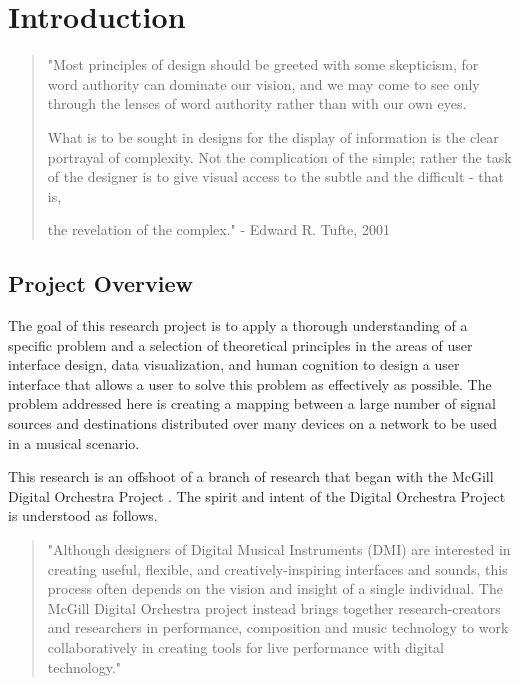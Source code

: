\resetdatestamp

\chapter{Introduction}

\begin{quote}
"Most principles of design should be greeted with some skepticism, for word authority can dominate our vision, and we may come to see only through the lenses of word authority rather than with our own eyes.

What is to be sought in designs for the display of information is the clear portrayal of complexity. Not the complication of the simple; rather the task of the designer is to give visual access to the subtle and the difficult - that is,

the revelation of the complex." - Edward R. Tufte, 2001 \cite{tuft2001}
\end{quote}

\section{Project Overview}

The goal of this research project is to apply a thorough understanding of a specific problem and a selection of theoretical principles in the areas of user interface design, data visualization, and human cognition to design a user interface that allows a user to solve this problem as effectively as possible. The problem addressed here is creating a mapping between a large number of signal sources and destinations distributed over many devices on a network to be used in a musical scenario. 

This research is an offshoot of a branch of research that began with the McGill Digital Orchestra Project \cite{orchestra2010}. The spirit and intent of the Digital Orchestra Project is understood as follows.

\begin{quote}
"Although designers of Digital Musical Instruments (DMI) are interested in creating useful, flexible, and creatively-inspiring interfaces and sounds, this process often depends on the vision and insight of a single individual. The McGill Digital Orchestra project instead brings together research-creators and researchers in performance, composition and music technology to work collaboratively in creating tools for live performance with digital technology." \cite{Malloch2007}
\end{quote}

